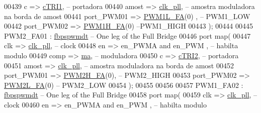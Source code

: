 \begin{DoxyCode}
00439          c => \hyperlink{class_d_e0___n_a_n_o___v_f_1_1_m_a_i_n_acbce87b3c43d76e6a2c55d2e90db56c3}{cTRI1},\textcolor{keyword}{ -- portadora}
00440          amost => \hyperlink{class_d_e0___n_a_n_o___v_f_1_1_m_a_i_n_a1d63ebfc050c1099e1dff991817ec3b0}{clk\_pll},\textcolor{keyword}{ -- amostra moduladora na borda de amost}
00441          port\_PWM01  => \hyperlink{class_d_e0___n_a_n_o___v_f_a292e884f4d72fca8a1bec36c11933ef7}{PWM1L\_FA}\textcolor{vhdlchar}{(}\textcolor{vhdllogic}{0}\textcolor{vhdlchar}{)} ,\textcolor{keyword}{ -- PWM1\_LOW}
00442          port\_PWM02 => \hyperlink{class_d_e0___n_a_n_o___v_f_af21e77adde949f9a9a599f25976a6a74}{PWM1H\_FA}\textcolor{vhdlchar}{(}\textcolor{vhdllogic}{0}\textcolor{vhdlchar}{)}\textcolor{keyword}{   --PWM1\_HIGH}
00443          \textcolor{vhdlchar}{)};  
00444         
00445 PWM2\_FA01 : \hyperlink{classfbpspwmdt}{fbpspwmdt} -- One leg \textcolor{keywordflow}{of} the Full Bridge
00446     \textcolor{keywordflow}{port} \textcolor{keywordflow}{map}( 
00447          clk => \hyperlink{class_d_e0___n_a_n_o___v_f_1_1_m_a_i_n_a1d63ebfc050c1099e1dff991817ec3b0}{clk\_pll},\textcolor{keyword}{ -- clock}
00448          en => en\_PWMA \textcolor{keywordflow}{and} en\_PWM  ,\textcolor{keyword}{ -- habilta modulo}
00449          comp  => \hyperlink{class_d_e0___n_a_n_o___v_f_1_1_m_a_i_n_a02405666f0ec5525888d897c8ddb079f}{ma},\textcolor{keyword}{ -- moduladora     }
00450          c => \hyperlink{class_d_e0___n_a_n_o___v_f_1_1_m_a_i_n_a0691f44fd4ef0a19b491e285cbb23286}{cTRI2},\textcolor{keyword}{ -- portadora}
00451          amost => \hyperlink{class_d_e0___n_a_n_o___v_f_1_1_m_a_i_n_a1d63ebfc050c1099e1dff991817ec3b0}{clk\_pll},\textcolor{keyword}{ -- amostra moduladora na borda de amost}
00452          port\_PWM01  => \hyperlink{class_d_e0___n_a_n_o___v_f_a3a05a366015b8398929044188870fa7b}{PWM2H\_FA}\textcolor{vhdlchar}{(}\textcolor{vhdllogic}{0}\textcolor{vhdlchar}{)},\textcolor{keyword}{ -- PWM2\_HIGH}
00453          port\_PWM02 => \hyperlink{class_d_e0___n_a_n_o___v_f_a357d73a496027c4f7000298ecdc41a05}{PWM2L\_FA}\textcolor{vhdlchar}{(}\textcolor{vhdllogic}{0}\textcolor{vhdlchar}{)}\textcolor{keyword}{   -- PWM2\_LOW}
00454          \textcolor{vhdlchar}{)};         
00455 
00456 
00457 PWM1\_FA02 : \hyperlink{classfbpspwmdt}{fbpspwmdt} -- One leg \textcolor{keywordflow}{of} the Full Bridge
00458     \textcolor{keywordflow}{port} \textcolor{keywordflow}{map}( 
00459          clk => \hyperlink{class_d_e0___n_a_n_o___v_f_1_1_m_a_i_n_a1d63ebfc050c1099e1dff991817ec3b0}{clk\_pll},\textcolor{keyword}{ -- clock}
00460          en => en\_PWMA \textcolor{keywordflow}{and} en\_PWM  ,\textcolor{keyword}{ -- habilta modulo}

\end{DoxyCode}
